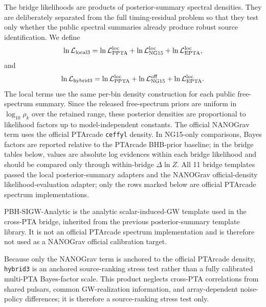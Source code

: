 \documentclass[aps,prl,superscriptaddress,nofootinbib]{revtex4-2}
\begin{document}
The bridge likelihoods are products of posterior-summary spectral
densities.  They are deliberately separated from the full timing-residual
problem so that they test only whether the public spectral summaries already
produce robust source identification.  We define
\begin{equation}
\ln\mathcal{L}_\mathrm{local3}
=\ln\mathcal{L}_\mathrm{PPTA}^{\rm loc}
+\ln\mathcal{L}_\mathrm{NG15}^{\rm loc}
+\ln\mathcal{L}_\mathrm{EPTA}^{\rm loc},
\end{equation}
and
\begin{equation}
\ln\mathcal{L}_\mathrm{hybrid3}
=\ln\mathcal{L}_\mathrm{PPTA}^{\rm loc}
+\ln\mathcal{L}_\mathrm{NG15}^{\rm off}
+\ln\mathcal{L}_\mathrm{EPTA}^{\rm loc}.
\end{equation}
The local terms use the same per-bin density construction for each public
free-spectrum summary.  Since the released free-spectrum priors are uniform in
$\log_{10}\rho_k$ over the retained range, these posterior densities are
proportional to likelihood factors up to model-independent constants.  The
official NANOGrav term uses the official PTArcade \texttt{ceffyl} density.  In
NG15-only comparisons, Bayes factors are reported relative to the PTArcade
BHB-prior baseline; in the bridge tables below, values are absolute log
evidences within each bridge likelihood and should be compared only through
within-bridge $\Delta\ln Z$.  All 11 bridge templates passed the local
posterior-summary adapters and the NANOGrav official-density
likelihood-evaluation adapter; only the rows marked below are official
PTArcade spectrum implementations.

PBH-SIGW-Analytic is the analytic scalar-induced-GW template used in the
cross-PTA bridge, inherited from the previous posterior-summary template
library.  It is not an official PTArcade spectrum implementation and is
therefore not used as a NANOGrav official calibration target.

Because only the NANOGrav term is anchored to the official PTArcade density,
\texttt{hybrid3} is an anchored source-ranking stress test rather than a fully
calibrated multi-PTA Bayes-factor scale.  This product neglects cross-PTA
correlations from shared pulsars, common GW-realization information, and
array-dependent noise-policy differences; it is therefore a source-ranking
stress test only.
\end{document}
